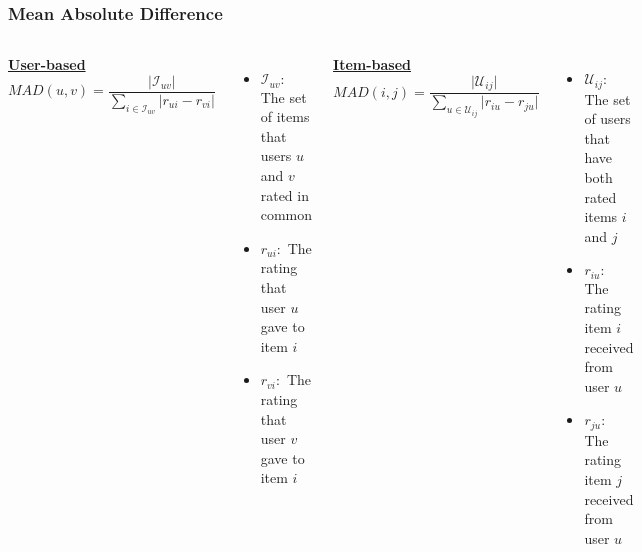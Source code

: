 \begin{frame}
    \frametitle{Mean Absolute Difference}
    \begin{columns}
        \centering
        \underline{\textbf{User-based}}
        \begin{equation*}
        MAD(u,v) = \frac{\mathopen|\mathcal{I}_{uv}\mathclose|}
                        {\sum_{i \in \mathcal{I}_{uv}}\mathopen|r_{ui}-r_{vi}\mathclose|}
    \end{equation*}
        \tiny
        \begin{itemize}
            \item $\mathcal{I}_{uv}:$ The set of items that users $u$ and $v$ rated in common
            \item $r_{ui}:$ The rating that user $u$ gave to item $i$
            \item $r_{vi}:$ The rating that user $v$ gave to item $i$
        \end{itemize}
        \centering
        \underline{\textbf{Item-based}}
        \begin{equation*}
        MAD(i,j) = \frac{\mathopen|\mathcal{U}_{ij}\mathclose|}
                        {\sum_{u \in \mathcal{U}_{ij}}\mathopen|r_{iu}-r_{ju}\mathclose|}
    \end{equation*}
        \tiny
        \begin{itemize}
            \item $\mathcal{U}_{ij}:$ The set of users that have both rated items $i$ and $j$
            \item $r_{iu}:$ The rating item $i$ received from user $u$
            \item $r_{ju}:$ The rating item $j$ received from user $u$
        \end{itemize}
    \end{columns}
\end{frame}
